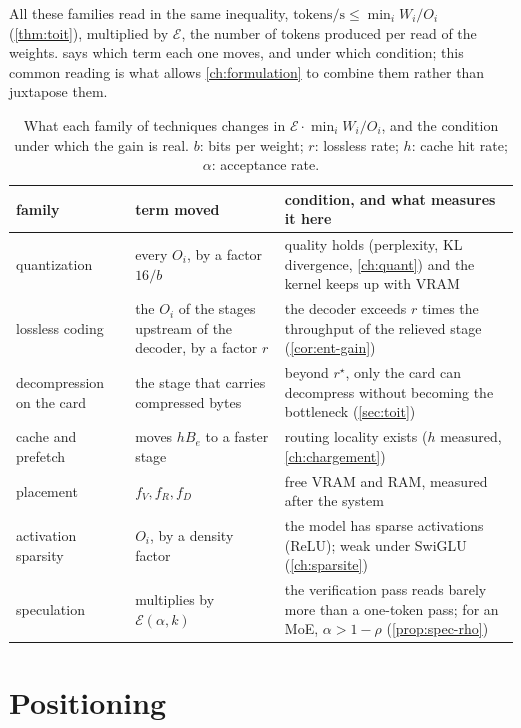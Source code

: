 All these families read in the same inequality, $\text{tokens/s} \le \min_i W_i / O_i$ (\cref{thm:toit}), multiplied by $\mathcal E$, the number of tokens produced per read of the weights.  says which term each one moves, and under which condition; this common reading is what allows \cref{ch:formulation} to combine them rather than juxtapose them.

\begin{table}[ht]
\centering\small
\caption[What each family changes in the roof inequality]{What each family of techniques changes in $\mathcal E \cdot \min_i W_i/O_i$, and the condition under which the gain is real. $b$: bits per weight; $r$: lossless rate; $h$: cache hit rate; $\alpha$: acceptance rate.}
\label{tab:etat-leviers}
\begin{tabularx}{\linewidth}{@{}>{\raggedright}p{2.7cm}>{\raggedright}p{3.4cm}>{\raggedright\arraybackslash}X@{}}
\toprule
family & term moved & condition, and what measures it here \\
\midrule
quantization & every $O_i$, by a factor $16/b$ & quality holds (perplexity, KL divergence, \cref{ch:quant}) and the kernel keeps up with VRAM \\
lossless coding & the $O_i$ of the stages upstream of the decoder, by a factor $r$ & the decoder exceeds $r$ times the throughput of the relieved stage (\cref{cor:ent-gain}) \\
decompression on the card & the stage that carries compressed bytes & beyond $r^\star$, only the card can decompress without becoming the bottleneck (\cref{sec:toit}) \\
cache and prefetch & moves $h B_e$ to a faster stage & routing locality exists ($h$ measured, \cref{ch:chargement}) \\
placement & $f_V, f_R, f_D$ & free VRAM and RAM, measured after the system \\
activation sparsity & $O_i$, by a density factor & the model has sparse activations (ReLU); weak under SwiGLU (\cref{ch:sparsite}) \\
speculation & multiplies by $\mathcal E(\alpha, k)$ & the verification pass reads barely more than a one-token pass; for an MoE, $\alpha > 1 - \rho$ (\cref{prop:spec-rho}) \\
\bottomrule
\end{tabularx}
\end{table}

\section{Positioning}\label{sec:positionnement}

